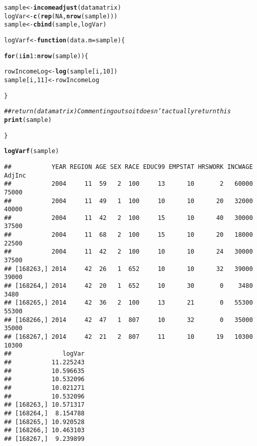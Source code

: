 \documentclass{article}\usepackage[]{graphicx}\usepackage[]{color}
\makeatletter
\newcommand{\hlnum}[1]{\textcolor[rgb]{0.686,0.059,0.569}{#1}}%
\newcommand{\hlcom}[1]{\textcolor[rgb]{0.678,0.584,0.686}{\textit{#1}}}%
\newcommand{\hlopt}[1]{\textcolor[rgb]{0,0,0}{#1}}%
\newcommand{\hlstd}[1]{\textcolor[rgb]{0.345,0.345,0.345}{#1}}%
\newcommand{\hlkwa}[1]{\textcolor[rgb]{0.161,0.373,0.58}{\textbf{#1}}}%
\newcommand{\hlkwb}[1]{\textcolor[rgb]{0.69,0.353,0.396}{#1}}%
\newcommand{\hlkwc}[1]{\textcolor[rgb]{0.333,0.667,0.333}{#1}}%
\newcommand{\hlkwd}[1]{\textcolor[rgb]{0.737,0.353,0.396}{\textbf{#1}}}%
\newenvironment{kframe}{%
 \def\at@end@of@kframe{}%
 \ifinner\ifhmode%
  \def\at@end@of@kframe{\end{minipage}}%
  \begin{minipage}{\columnwidth}%
 \fi\fi%
 \def\FrameCommand##1{\hskip\@totalleftmargin \hskip-\fboxsep
 \colorbox{shadecolor}{##1}\hskip-\fboxsep
     \hskip-\linewidth \hskip-\@totalleftmargin \hskip\columnwidth}%
 \MakeFramed {\advance\hsize-\width
   \@totalleftmargin\z@ \linewidth\hsize
   \@setminipage}}%
 {\par\unskip\endMakeFramed%
 \at@end@of@kframe}
\newenvironment{knitrout}{}{} %
\makeatother
\begin{document}
\begin{knitrout}
\color{fgcolor}\begin{kframe}
\begin{alltt}
\hlstd{sample} \hlkwb{<-} \hlkwd{incomeadjust}\hlstd{(datamatrix)}
\hlstd{logVar} \hlkwb{<-} \hlkwd{c}\hlstd{(}\hlkwd{rep}\hlstd{(}\hlnum{NA}\hlstd{,} \hlkwd{nrow}\hlstd{(sample)))}
\hlstd{sample} \hlkwb{<-} \hlkwd{cbind}\hlstd{(sample, logVar)}



\hlstd{logVarf} \hlkwb{<-} \hlkwa{function}\hlstd{(}\hlkwc{data.m} \hlstd{= sample)\{}

  \hlkwa{for} \hlstd{(i} \hlkwa{in} \hlnum{1}\hlopt{:}\hlkwd{nrow}\hlstd{(sample))\{}

    \hlstd{rowIncomeLog} \hlkwb{<-} \hlkwd{log}\hlstd{(sample[i,}\hlnum{10}\hlstd{])}
    \hlstd{sample[i,}\hlnum{11}\hlstd{]} \hlkwb{<-} \hlstd{rowIncomeLog}

  \hlstd{\}}

  \hlcom{## return(datamatrix) Commenting out so it doesn't actually return this}
  \hlkwd{print}\hlstd{(sample)}

\hlstd{\}}

\hlkwd{logVarf}\hlstd{(sample)}
\end{alltt}
\begin{verbatim}
##           YEAR REGION AGE SEX RACE EDUC99 EMPSTAT HRSWORK INCWAGE AdjInc
##           2004     11  59   2  100     13      10       2   60000  75000
##           2004     11  49   1  100     10      10      20   32000  40000
##           2004     11  42   2  100     15      10      40   30000  37500
##           2004     11  68   2  100     15      10      20   18000  22500
##           2004     11  42   2  100     10      10      24   30000  37500
## [168263,] 2014     42  26   1  652     10      10      32   39000  39000
## [168264,] 2014     42  20   1  652     10      30       0    3480   3480
## [168265,] 2014     42  36   2  100     13      21       0   55300  55300
## [168266,] 2014     42  47   1  807     10      32       0   35000  35000
## [168267,] 2014     42  21   2  807     11      10      19   10300  10300
##              logVar
##           11.225243
##           10.596635
##           10.532096
##           10.021271
##           10.532096
## [168263,] 10.571317
## [168264,]  8.154788
## [168265,] 10.920528
## [168266,] 10.463103
## [168267,]  9.239899
\end{verbatim}
\end{kframe}
\end{knitrout}
\end{document}
